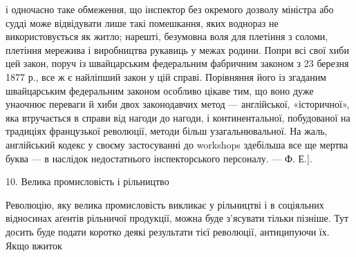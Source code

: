 {і одночасно таке обмеження, що інспектор без окремого дозволу міністра
або судді може відвідувати лише такі помешкання, яких воднораз не
використовується як житло; нарешті, безумовна воля для плетіння з
соломи, плетіння мережива і виробництва рукавиць у межах родини.
Попри всі свої хиби цей закон, поруч із швайцарським федеральним
фабричним законом з 23 березня 1877 р., все ж є найліпший закон у цій
справі. Порівняння його із згаданим швайцарським федеральним законом
особливо цікаве тим, що воно дуже унаочнює переваги й хиби двох законодавчих
метод — англійської, «історичної», яка втручається в справи
від нагоди до нагоди, і континентальної, побудованої на традиціях французької
революції, методи більш узагальнювальної. На жаль, англійський
кодекс у своєму застосуванні до workshops здебільша все ще мертва
буква — в наслідок недостатнього інспекторського персоналу. — Ф. Е.].
}

10. Велика промисловість і рільництво

Революцію, яку велика промисловість викликає у рільництві
і в соціяльних відносинах аґентів рільничої продукції, можна
буде з’ясувати тільки пізніше. Тут досить буде подати коротко
деякі результати тієї революції, антиципуючи їх. Якщо вжиток
\parbreak{}  %
